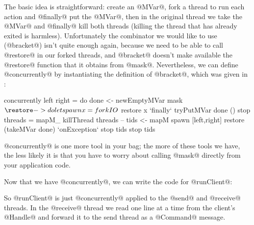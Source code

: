 The basic idea is straightforward: create an @MVar@, fork a thread to
run each action and @finally@ put the @MVar@, then in the original
thread we take the @MVar@ and @finally@ kill both threads (killing the
thread that has already exited is harmless).  Unfortunately the
combinator we would like to use (@bracket@) isn't quite enough again,
because we need to be able to call @restore@ in our forked threads,
and @bracket@ doesn't make available the @restore@ function that it
obtains from @mask@.  Nevertheless, we can define @concurrently@ by
instantiating the definition of @bracket@, which was given in
:

\begin{haskell}
concurrently left right = do
    done <- newEmptyMVar
    mask $ \restore -> do
        let
            spawn x = forkIO $ restore x `finally` tryPutMVar done ()
            stop threads = mapM_ killThread threads
        --
        tids <- mapM spawn [left,right]
        restore (takeMVar done) `onException` stop tids
        stop tids
\end{haskell}

@concurrently@ is one more tool in your bag; the more of these tools
we have, the less likely it is that you have to worry about calling
@mask@ directly from your application code.

Now that we have @concurrently@, we can write the code for
@runClient@:


So @runClient@ is just @concurrently@ applied to the @send@ and
@receive@ threads.  In the @receive@ thread we read one line at a time
from the client's @Handle@ and forward it to the send thread as a
@Command@ message.

